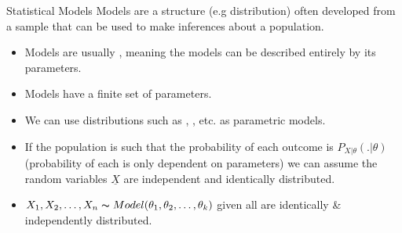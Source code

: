 \begin{definitionbox}{Statistical Models}
	Models are a structure (e.g distribution) often developed from a sample that can be used to make inferences about a population.
	\begin{itemize}
		\item Models are usually , meaning the models can be described entirely by its parameters.
		\item Models have a finite set of parameters.
	\end{itemize}
	\begin{itemize}
		\item We can use distributions such as , ,  etc. as parametric models.
		\item If the population is such that the probability of each outcome is $P_{X|\theta}(.|\theta)$ (probability of each is only dependent on parameters) we can assume the random variables $\underline{X}$ are independent and identically distributed.
		\item $X_1, X_2, \dots, X_n \thicksim Model(\theta_1, \theta_2, \dots, \theta_k)$ given all are identically \& independently distributed.
	\end{itemize}
\end{definitionbox}

